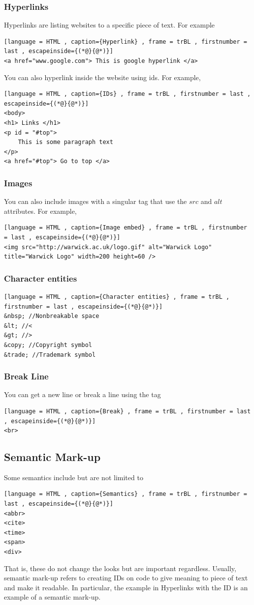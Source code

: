\documentclass[a4paper]{article}
\theoremstyle{plain}
\theoremstyle{definition}
\theoremstyle{remark}
\begin{document}
\subsubsection{Hyperlinks}
\begin{flushleft}
Hyperlinks are listing websites to a specific piece of text. For example
\begin{lstlisting}[language = HTML , caption={Hyperlink} , frame = trBL , firstnumber = last , escapeinside={(*@}{@*)}]
<a href="www.google.com"> This is google hyperlink </a>
\end{lstlisting}
You can also hyperlink inside the website using ids. For example,
\begin{lstlisting}[language = HTML , caption={IDs} , frame = trBL , firstnumber = last , escapeinside={(*@}{@*)}]
<body>
<h1> Links </h1>
<p id = "#top">
	This is some paragraph text
</p>
<a href="#top"> Go to top </a>
\end{lstlisting}
\subsubsection{Images}
You can also include images with a singular tag that use the $src$ and $alt$ attributes.
For example,
\begin{lstlisting}[language = HTML , caption={Image embed} , frame = trBL , firstnumber = last , escapeinside={(*@}{@*)}]
<img src="http://warwick.ac.uk/logo.gif" alt="Warwick Logo" title="Warwick Logo" width=200 height=60 />
\end{lstlisting}
\subsubsection{Character entities}
\begin{lstlisting}[language = HTML , caption={Character entities} , frame = trBL , firstnumber = last , escapeinside={(*@}{@*)}]
&nbsp; //Nonbreakable space
&lt; //<
&gt; //>
&copy; //Copyright symbol
&trade; //Trademark symbol
\end{lstlisting}
\subsubsection{Break Line}
You can get a new line or break a line using the tag
\begin{lstlisting}[language = HTML , caption={Break} , frame = trBL , firstnumber = last , escapeinside={(*@}{@*)}]
<br>
\end{lstlisting}
\subsection{Semantic Mark-up}
Some semantics include but are not limited to
\begin{lstlisting}[language = HTML , caption={Semantics} , frame = trBL , firstnumber = last , escapeinside={(*@}{@*)}]
<abbr>
<cite>
<time>
<span>
<div>
\end{lstlisting}
That is, these do not change the looks but are important regardless. Usually, semantic mark-up refers to creating IDs on code to give meaning to piece of text and make it readable. In particular, the example in Hyperlinks with the ID is an example of a semantic mark-up.

\end{flushleft}
\end{document}
